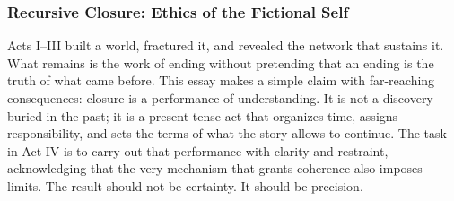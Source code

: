 \documentclass[11pt]{article}
\begin{document}
\subsubsection*{Recursive Closure: Ethics of the Fictional Self}
\label{sec:orgec13c7a}

Acts I–III built a world, fractured it, and revealed the network that sustains it. What remains is the work of ending without pretending that an ending is the truth of what came before. This essay makes a simple claim with far-reaching consequences: closure is a performance of understanding. It is not a discovery buried in the past; it is a present-tense act that organizes time, assigns responsibility, and sets the terms of what the story allows to continue. The task in Act IV is to carry out that performance with clarity and restraint, acknowledging that the very mechanism that grants coherence also imposes limits. The result should not be certainty. It should be precision.
\end{document}
